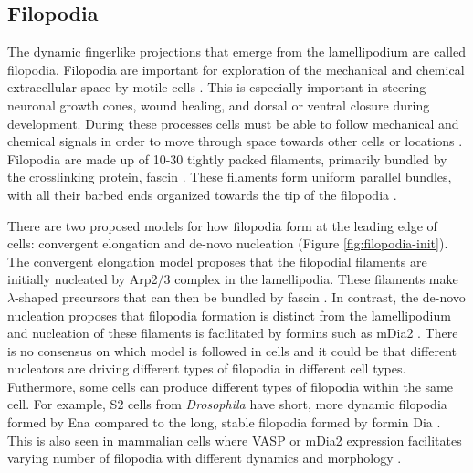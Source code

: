 \subsection{Filopodia}\label{filopodia-intro}
The dynamic fingerlike projections that emerge from the lamellipodium are called filopodia. Filopodia are important for exploration of the mechanical and chemical extracellular space by motile cells \citep{mattila_filopodia:_2008}. This is especially important in steering neuronal growth cones, wound healing, and dorsal or ventral closure during development. During these processes cells must be able to follow mechanical and chemical signals in order to move through space towards other cells or locations \citep{bornschlogl_how_2013}. Filopodia are made up of 10-30 tightly packed filaments, primarily bundled by the crosslinking protein, fascin \citep{vignjevic_role_2006, mellor_role_2010}. These filaments form uniform parallel bundles, with all their barbed ends organized towards the tip of the filopodia \citep{bornschlogl_how_2013}.

There are two proposed models for how filopodia form at the leading edge of cells: convergent elongation \citep{yang_filopodia_2011} and de-novo nucleation \citep{faix_filopodia:_2009} (Figure \ref{fig:filopodia-init}). The convergent elongation model proposes that the filopodial filaments are initially nucleated by Arp2/3 complex in the lamellipodia. These filaments make $\lambda$-shaped precursors that can then be bundled by fascin \citep{svitkina_mechanism_2003,small_lamellipodium:_2002}. In contrast, the de-novo nucleation proposes that filopodia formation is distinct from the lamellipodium and nucleation of these filaments is facilitated by formins such as mDia2 \citep{faix_making_2006,mellor_role_2010}. There is no consensus on which model is followed in cells and it could be that different nucleators are driving different types of filopodia in different cell types. Futhermore, some cells can produce different types of filopodia within the same cell. For example, S2 cells from \textit{Drosophila} have short, more dynamic filopodia formed by Ena compared to the long, stable filopodia formed by formin Dia \citep{bilancia_enabled_2014}. This is also seen in mammalian cells where VASP or mDia2 expression facilitates varying number of filopodia with different dynamics and morphology \citep{barzik_ena/vasp_2014}. 

